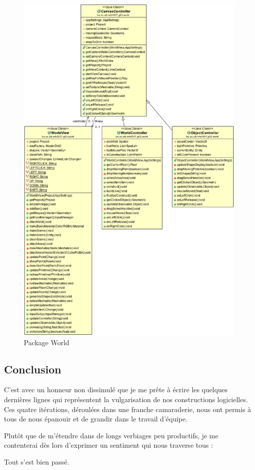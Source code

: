 	\begin{figure}
		\center
		\includegraphics[height=\textheight]{iteration4/fig/world.png}
		\caption{Package World}
	\end{figure}

\subsection{Conclusion}
C'est avec un honneur non dissimulé que je me prête à écrire les quelques
dernières lignes qui représentent la vulgarisation de nos constructions logicielles.
Ces quatre itérations, déroulées dans une franche camaraderie, nous ont permis
à tous de nous épanouir et de grandir dans le travail d'équipe.

Plutôt que de m'étendre dans de longs verbiages peu productifs, je me contenterai
dès lors d'exprimer un sentiment qui nous traverse tous : 

Tout s'est bien passé.
